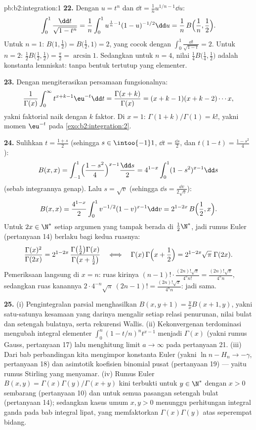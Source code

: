 \begin{solution}{pb:b2:integration:1}
\textbf{22.} Dengan $u = t^n$ dan $\dd t = \frac1n u^{1/n - 1}\dd
u$:
\[
\int_0^1 \frac{\dd t}{\sqrt{1-t^n}}
= \frac1n\int_0^1 u^{\frac1n-1}(1-u)^{-1/2}\dd u
= \frac1n\,B\Bigl(\frac1n, \frac12\Bigr) .
\]
Untuk $n = 1$: $B\bigl(1,\frac12\bigr) = B\bigl(\frac12,1\bigr) = 2$,
yang cocok dengan $\int_0^1\frac{\dd t}{\sqrt{1-t}} = 2$. Untuk $n = 2$:
$\frac12 B\bigl(\frac12,\frac12\bigr) = \frac\pi2 = \arcsin 1$.
Sedangkan untuk $n = 4$, nilai $\frac14 B\bigl(\frac14,\frac12\bigr)$
adalah konstanta lemniskat: tanpa bentuk tertutup yang elementer.

\textbf{23.} Dengan mengiterasikan persamaan fungsionalnya:
\[
\frac{1}{\Gamma(x)}\int_0^\infty t^{x+k-1}\eu^{-t}\dd t
= \frac{\Gamma(x+k)}{\Gamma(x)}
= (x+k-1)(x+k-2)\cdots x ,
\]
yakni faktorial naik dengan $k$ faktor. Di $x = 1$:
$\Gamma(1+k)/\Gamma(1) = k!$, yakni momen $\eu^{-t}$ pada
\cref{exo:b2:integration:2}.

\textbf{24.} Sulihkan $t = \frac{1+s}2$ (sehingga $s \in
\intoo{-1}1$, $\dd t = \frac{\dd s}2$, dan $t(1-t) =
\frac{1-s^2}4$):
\[
B(x,x) = \int_{-1}^{1}\Bigl(\frac{1-s^2}{4}\Bigr)^{x-1}
\frac{\dd s}{2}
= 4^{1-x}\int_0^1 (1-s^2)^{x-1}\dd s
\]
(sebab integrannya genap). Lalu $s = \sqrt v$ (sehingga $\dd s =
\frac{\dd v}{2\sqrt v}$):
\[
B(x,x) = \frac{4^{1-x}}{2}\int_0^1
v^{-1/2}(1-v)^{x-1}\dd v
= 2^{1-2x}\,B\Bigl(\frac12, x\Bigr) .
\]
Untuk $2x \in \N^*$ setiap argumen yang tampak berada di
$\frac12\N^*$, jadi rumus Euler (pertanyaan 14) berlaku bagi kedua
ruasnya:
\[
\frac{\Gamma(x)^2}{\Gamma(2x)}
= 2^{1-2x}\,
\frac{\Gamma\bigl(\frac12\bigr)\Gamma(x)}
{\Gamma\bigl(x+\frac12\bigr)}
\quad\Longleftrightarrow\quad
\Gamma(x)\,\Gamma\Bigl(x+\frac12\Bigr)
= 2^{1-2x}\sqrt\pi\;\Gamma(2x) .
\]
Pemeriksaan langsung di $x = n$: ruas kirinya $(n-1)!\cdot
\frac{(2n)!\sqrt\pi}{4^n n!} = \frac{(2n)!\sqrt\pi}{4^n n}$, sedangkan
ruas kanannya $2\cdot4^{-n}\sqrt\pi\,(2n-1)! =
\frac{(2n)!\sqrt\pi}{4^n n}$: jadi sama.

\textbf{25.} (i) Pengintegralan parsial menghasilkan $B(x,y+1) =
\frac yx B(x+1,y)$, yakni satu-satunya kesamaan yang darinya mengalir
setiap relasi penurunan, nilai bulat dan setengah bulatnya, serta
rekurensi Wallis. (ii) Kekonvergenan terdominasi mengubah
integral elementer $\int_0^n(1-t/n)^n t^{x-1}$ menjadi
$\Gamma(x)$ (yakni rumus Gauss, pertanyaan 17) lalu menghitung
limit $a \to \infty$ pada pertanyaan 21. (iii) Dari bab
perbandingan kita mengimpor konstanta Euler (yakni $\ln n - H_n \to
-\gamma$, pertanyaan 18) dan asimtotik koefisien binomial pusat
(pertanyaan 19) --- yaitu rumus Stirling yang menyamar. (iv)
Rumus Euler $B(x,y) = \Gamma(x)\Gamma(y)/\Gamma(x+y)$ kini
terbukti untuk $y \in \N^*$ dengan $x > 0$ sembarang (pertanyaan
10) dan untuk semua pasangan setengah bulat (pertanyaan 14);
sedangkan kasus umum $x, y > 0$ menunggu perhitungan integral ganda
pada bab integral lipat, yang memfaktorkan
$\Gamma(x)\Gamma(y)$ atas seperempat bidang.

\end{solution}
